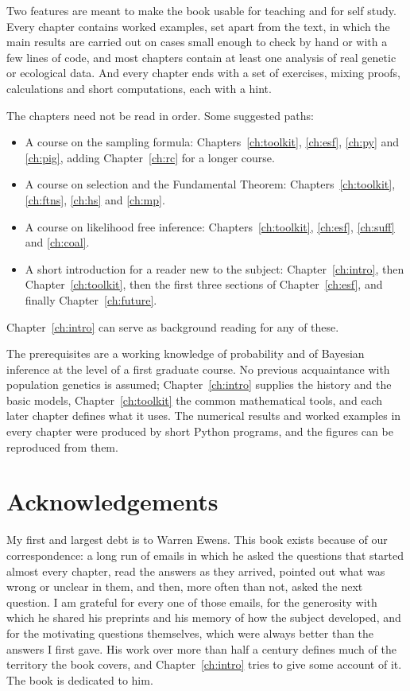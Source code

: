 Two features are meant to make the book usable for teaching and for self study. Every chapter
contains worked examples, set apart from the text, in which the main results are carried out on
cases small enough to check by hand or with a few lines of code, and most chapters contain at least one
analysis of real genetic or ecological data. And every chapter ends with a set of exercises,
mixing proofs, calculations and short computations, each with a hint.

The chapters need not be read in order. Some suggested paths:
\begin{itemize}[leftmargin=*]
\item A course on the sampling formula: Chapters~\ref{ch:toolkit}, \ref{ch:esf}, \ref{ch:py}
and \ref{ch:pig}, adding Chapter~\ref{ch:rc} for a longer course.
\item A course on selection and the Fundamental Theorem: Chapters~\ref{ch:toolkit},
\ref{ch:ftns}, \ref{ch:hs} and \ref{ch:mp}.
\item A course on likelihood free inference: Chapters~\ref{ch:toolkit}, \ref{ch:esf},
\ref{ch:suff} and \ref{ch:coal}.
\item A short introduction for a reader new to the subject: Chapter~\ref{ch:intro}, then
Chapter~\ref{ch:toolkit}, then the first three sections of Chapter~\ref{ch:esf}, and finally
Chapter~\ref{ch:future}.
\end{itemize}
Chapter~\ref{ch:intro} can serve as background reading for any of these.

The prerequisites are a working knowledge of probability and of Bayesian inference at the level of
a first graduate course. No previous acquaintance with population genetics is assumed;
Chapter~\ref{ch:intro} supplies the history and the basic models, Chapter~\ref{ch:toolkit} the
common mathematical tools, and each later chapter defines what it uses. The numerical results and
worked examples in every chapter were produced by short Python programs, and the figures can be
reproduced from them.

\section*{Acknowledgements}

My first and largest debt is to Warren Ewens. This book exists because of our correspondence: a
long run of emails in which he asked the questions that started almost every chapter, read the
answers as they arrived, pointed out what was wrong or unclear in them, and then, more often than
not, asked the next question. I am grateful for every one of those emails, for the generosity with
which he shared his preprints and his memory of how the subject developed, and for the motivating
questions themselves, which were always better than the answers I first gave. His work over more
than half a century defines much of the territory the book covers, and Chapter~\ref{ch:intro}
tries to give some account of it. The book is dedicated to him.

